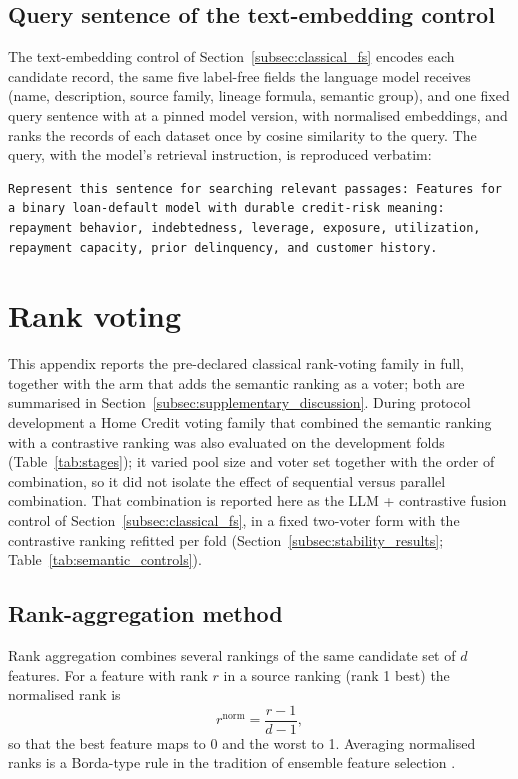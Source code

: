 \documentclass[final,5p,twocolumn]{elsarticle}
\begin{document}
\subsection{Query sentence of the text-embedding control}
\label{app:text_query}
The text-embedding control of Section~\ref{subsec:classical_fs} encodes each candidate record, the same five label-free fields the language model receives (name, description, source family, lineage formula, semantic group), and one fixed query sentence with  at a pinned model version, with normalised embeddings, and ranks the records of each dataset once by cosine similarity to the query. The query, with the model's retrieval instruction, is reproduced verbatim:
\begin{lstlisting}
Represent this sentence for searching relevant passages: Features for a binary loan-default model with durable credit-risk meaning: repayment behavior, indebtedness, leverage, exposure, utilization, repayment capacity, prior delinquency, and customer history.
\end{lstlisting}

\section{Rank voting}
\label{app:voting}
\setcounter{table}{0}\setcounter{figure}{0}

This appendix reports the pre-declared classical rank-voting family in full, together with the arm that adds the semantic ranking as a voter; both are summarised in Section~\ref{subsec:supplementary_discussion}. During protocol development a Home Credit voting family that combined the semantic ranking with a contrastive ranking was also evaluated on the development folds (Table~\ref{tab:stages}); it varied pool size and voter set together with the order of combination, so it did not isolate the effect of sequential versus parallel combination. That combination is reported here as the LLM + contrastive fusion control of Section~\ref{subsec:classical_fs}, in a fixed two-voter form with the contrastive ranking refitted per fold (Section~\ref{subsec:stability_results}; Table~\ref{tab:semantic_controls}).

\subsection{Rank-aggregation method}
\label{subsec:voting_fs}

Rank aggregation combines several rankings of the same candidate set of $d$ features. For a feature with rank $r$ in a source ranking (rank 1 best) the normalised rank is
\begin{equation}
    r^{\mathrm{norm}}=\frac{r-1}{d-1},
    \label{eq:normrank}
\end{equation}
so that the best feature maps to 0 and the worst to 1. Averaging normalised ranks is a Borda-type rule \cite{dwork2001} in the tradition of ensemble feature selection \cite{saeys2008}.
\end{document}

